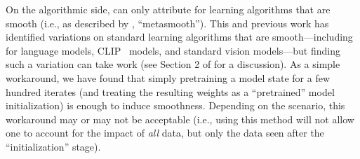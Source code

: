 On the algorithmic side, \method{} can only attribute for learning algorithms
that are smooth 
(i.e., as described by \citet{engstrom2025optimizing}, 
``metasmooth''). This and
previous work has identified variations on standard learning algorithms that
are smooth---including for language models,
CLIP~\citep{radford2021learning} models, and standard vision models---but
finding such a variation can take work (see Section 2 of
\citet{engstrom2025optimizing} for a discussion). 
As a simple workaround, we have found
that simply pretraining a model state for a few hundred iterates
(and treating the resulting weights as a ``pretrained'' model initialization) 
is enough to induce smoothness.
Depending on the scenario, this workaround may or may not be acceptable
(i.e., using this method will not allow one to account for the impact of
{\em all} data, but only the data seen after the ``initialization'' stage).
